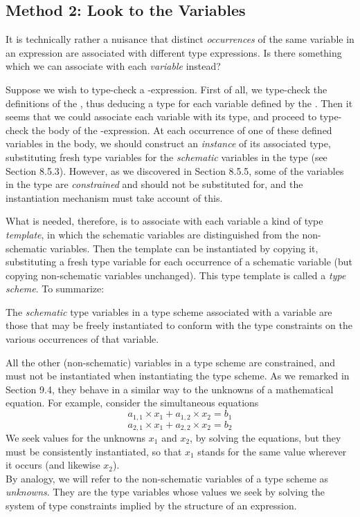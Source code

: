 \subsection{Method 2: Look to the Variables}

It is technically rather a nuisance that distinct \textit{occurrences} of the same variable
in an expression are associated with different type expressions. Is there
something which we can associate with each \textit{variable} instead?

Suppose we wish to type-check a -expression. First of all, we type-check
the definitions of the , thus deducing a type for each variable defined by the
. Then it seems that we could associate each variable with its type, and
proceed to type-check the body of the -expression. At each occurrence of
one of these defined variables in the body, we should construct an \textit{instance} of
its associated type, substituting fresh type variables for the \textit{schematic}
variables in the type (see Section 8.5.3). However, as we discovered in
Section 8.5.5, some of the variables in the type are \textit{constrained} and should not
be substituted for, and the instantiation mechanism must take account of this.

What is needed, therefore, is to associate with each variable a kind of type
\textit{template}, in which the schematic variables are distinguished from the non-
schematic variables. Then the template can be instantiated by copying it,
substituting a fresh type variable for each occurrence of a schematic variable
(but copying non-schematic variables unchanged). This type template is
called a \textit{type scheme}. To summarize:
\begin{numbered}
    \item The \textit{schematic} type variables in a type scheme associated with a variable
    are those that may be freely instantiated to conform with the type
    constraints on the various occurrences of that variable.
    \item All the other (non-schematic) variables in a type scheme are constrained, and must not be instantiated when instantiating the type scheme. As we
    remarked in Section 9.4, they behave in a similar way to the unknowns of
    a mathematical equation. For example, consider the simultaneous
    equations
    \[
    a_{1,1} \times x_1 + a_{1,2} \times x_2 = b_1
    \]
    \[
    a_{2,1} \times x_1 + a_{2,2} \times x_2 = b_2
    \]
    We seek values for the unknowns $x_1$ and $x_2$, by solving the equations, but
    they must be consistently instantiated, so that $x_1$ stands for the same value
    wherever it occurs (and likewise $x_2$).\\
    \phantom{XX}By analogy, we will refer to the non-schematic variables of a type
    scheme as \textit{unknowns}. They are the type variables whose values we seek by solving the system of type constraints implied by the structure of an
    expression.
\end{numbered}



